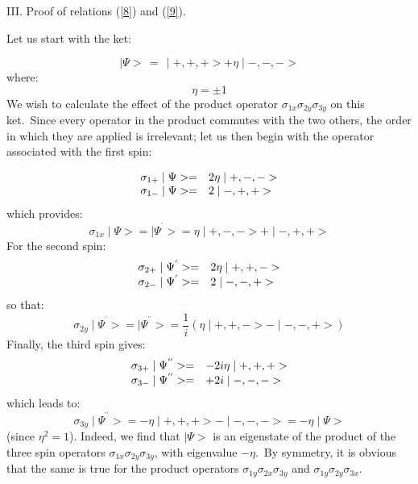 \documentclass[12pt,onecolumn]{article}%
\begin{document}
\bigskip

\begin{center}
III. Proof of relations (\ref{8}) and (\ref{9}).
\end{center}

Let us start with the ket:%

\begin{equation}
\mid\Psi>\,=\,\mid+,+,+>+\eta\mid-,-,-> \label{a1}%
\end{equation}
where:
\begin{equation}
\eta=\pm1 \label{a2}%
\end{equation}
We wish to calculate the effect of the product operator $\sigma_{1x}%
\sigma_{2y}\sigma_{3y}$ on this ket.\ Since every operator in the product
commutes with the two others, the order in which they are applied is
irrelevant; let us then begin with the operator associated with the first spin:%

\begin{equation}%
\begin{array}
[c]{ll}%
\sigma_{1+}\mid\Psi>= & 2\eta\mid+,-,->\\
\sigma_{1-}\mid\Psi>= & 2\mid-,+,+>
\end{array}
\label{a3}%
\end{equation}
which provides:
\begin{equation}
\sigma_{1x}\mid\Psi>=\mid\Psi^{^{\prime}}>=\eta\mid+,-,->+\mid-,+,+>
\label{a4}%
\end{equation}
For the second spin:
\begin{equation}%
\begin{array}
[c]{ll}%
\sigma_{2+}\mid\Psi^{^{\prime}}>= & 2\eta\mid+,+,->\\
\sigma_{2-}\mid\Psi^{^{\prime}}>= & 2\mid-,-,+>
\end{array}
\label{a5}%
\end{equation}
so that:
\begin{equation}
\sigma_{2y}\mid\Psi^{^{\prime}}>=\mid\Psi^{^{\prime\prime}}>=\frac{1}%
{i}\left(  \eta\mid+,+,->-\mid-,-,+>\right)  \label{a6}%
\end{equation}
Finally, the third spin gives:
\begin{equation}%
\begin{array}
[c]{ll}%
\sigma_{3+}\mid\Psi^{^{\prime\prime}}>= & -2i\eta\mid+,+,+>\\
\sigma_{3-}\mid\Psi^{^{\prime\prime}}>= & +2i\mid-,-,->
\end{array}
\label{a7}%
\end{equation}
which leads to:
\begin{equation}
\sigma_{3y}\mid\Psi^{^{\prime\prime}}>=-\eta\mid+,+,+>-\mid-,-,->=-\eta
\mid\Psi> \label{a8}%
\end{equation}
(since $\eta^{2}=1$). Indeed, we find that $\mid\Psi>$ is an eigenstate of the
product of the three spin operators $\sigma_{1x}\sigma_{2y}\sigma_{3y}$, with
eigenvalue $-\eta$.\ By symmetry, it is obvious that the same is true for the
product operators $\sigma_{1y}\sigma_{2x}\sigma_{3y}$ and $\sigma_{1y}%
\sigma_{2y}\sigma_{3x}$.
\end{document}
